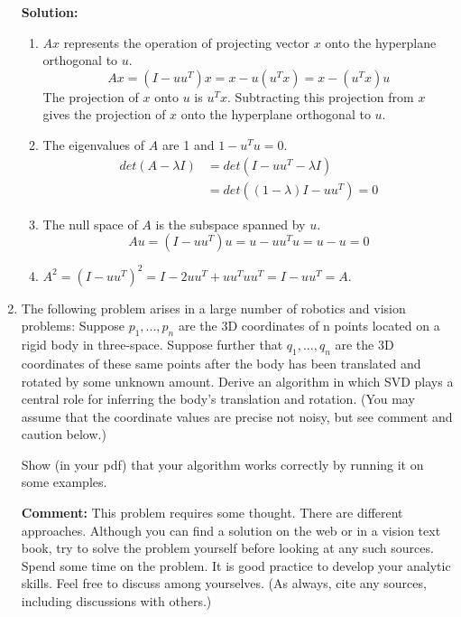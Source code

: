 \documentclass[conference,onecolumn]{IEEEtran}
\begin{document}
\begin{enumerate}[label=\arabic{enumi}.]
          \textbf{Solution:}
          \begin{enumerate}
              \item $Ax$ represents the operation of projecting vector $x$ onto the hyperplane orthogonal to $u$.
                    $$
                        Ax = (I - uu^T)x = x - u(u^Tx) = x - (u^Tx)u
                    $$
                    The projection of $x$ onto $u$ is $u^Tx$.
                    Subtracting this projection from $x$ gives the projection of $x$ onto the hyperplane orthogonal to $u$.
              \item The eigenvalues of $A$ are 1 and $1 - u^Tu = 0$.
                    \begin{align*}
                        det(A - \lambda I) & = det(I - uu^T - \lambda I)  \\
                                           & = det((1 - \lambda)I - uu^T) = 0
                    \end{align*}
              \item The null space of $A$ is the subspace spanned by $u$.
                    $$
                        Au = (I - uu^T)u = u - uu^Tu = u - u = 0
                    $$
              \item $A^2 = (I - uu^T)^2 = I - 2uu^T + uu^Tuu^T = I - uu^T = A$.
          \end{enumerate}

          \clearpage
    \item The following problem arises in a large number of robotics and vision problems: Suppose $p_1, . . . , p_n$ are the 3D coordinates of n points located on a rigid body in three-space.
          Suppose further that $q_1, . . . , q_n$ are the 3D coordinates of these same points after the body has been translated and rotated by some unknown amount.
          Derive an algorithm in which SVD plays a central role for inferring the body's translation and rotation.
          (You may assume that the coordinate values are precise not noisy, but see comment and caution below.)

          Show (in your pdf) that your algorithm works correctly by running it on some examples.

          \textbf{Comment:} This problem requires some thought.
          There are different approaches.
          Although you can find a solution on the web or in a vision text book, try to solve the problem yourself before looking at any such sources.
          Spend some time on the problem.
          It is good practice to develop your analytic skills.
          Feel free to discuss among yourselves.
          (As always, cite any sources, including discussions with others.)


\end{enumerate}
\end{document}
